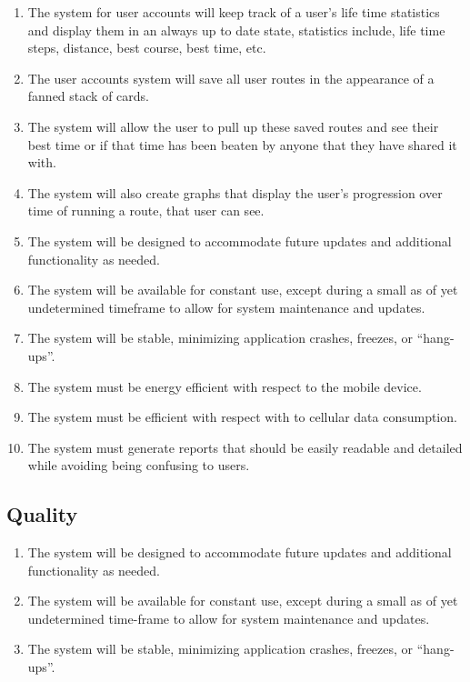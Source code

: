 \documentclass{article}
\begin{document}
\begin{enumerate}
    \item The system for user accounts will keep track of a user's life time statistics and display them in an always up to date state, statistics include, life time steps, distance, best course, best time, etc.
    \item The user accounts system will save all user routes in the appearance of a fanned stack of cards.
    \item The system will allow the user to pull up these saved routes and see their best time or if that time has been beaten by anyone that they have shared it with.
    \item The system will also create graphs that display the user’s progression over time of running a route, that user can see.
    \item The system will be designed to accommodate future updates and additional functionality as needed.
    \item The system will be available for constant use, except during a small as of yet undetermined timeframe to allow for system maintenance and updates.
    \item The system will be stable, minimizing application crashes, freezes, or “hang-ups”.
    \item The system must be energy efficient with respect to the mobile device.
    \item The system must be efficient with respect with to cellular data consumption.
    \item The system must generate reports that should be easily readable and detailed while avoiding being confusing to users.
    
    
    

\end{enumerate}
\subsection{Quality}
\begin{enumerate}
    \item The system will be designed to accommodate future updates and additional functionality as needed.
    \item The system will be available for constant use, except during a small as of yet undetermined time-frame to allow for system maintenance and updates.
    \item The system will be stable, minimizing application crashes, freezes, or “hang-ups”.
\end{enumerate}
\end{document}
